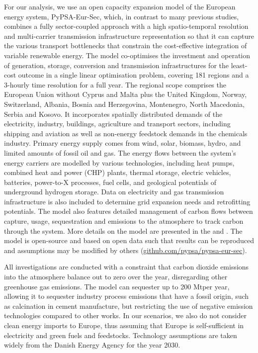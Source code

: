 For our analysis, we use an open capacity expansion model of the European energy
system, PyPSA-Eur-Sec, which, in contrast to many previous studies,
\cite{henningComprehensiveModel2014,mathiesenSmartEnergy2015,connollySmartEnergy2016,lofflerDesigningModel2017,blancoPotentialHydrogen2018,brownSynergiesSector2018,in-depth_2018,victoria2020}
combines a fully sector-coupled approach with a high spatio-temporal resolution
and multi-carrier transmission infrastructure representation so that it can
capture the various transport bottlenecks that constrain the cost-effective
integration of variable renewable energy. The model co-optimises the investment
and operation of generation, storage, conversion and transmission
infrastructures for the least-cost outcome in a single linear optimisation
problem, covering 181 regions and a 3-hourly time resolution for a full year.
The regional scope comprises the European Union without Cyprus and Malta plus the United
Kingdom, Norway, Switzerland, Albania, Bosnia and Herzegovina,
Montenegro, North Macedonia, Serbia and Kosovo. It incorporates spatially distributed
demands of the electricity, industry, buildings, agriculture and transport
sectors, including shipping and aviation as well as non-energy feedstock demands
in the chemicals industry. Primary energy supply comes from wind, solar,
biomass, hydro, and limited amounts of fossil oil and gas. The energy flows
between the system's energy carriers are modelled by various technologies,
including heat pumps, combined heat and power (CHP) plants, thermal storage,
electric vehicles, batteries, power-to-X processes, fuel cells, and geological
potentials of underground hydrogen storage. Data on electricity and gas
transmission infrastructure is also included to determine grid expansion needs
and retrofitting potentials. The model also features detailed management of
carbon flows between capture, usage, sequestration and emissions to the
atmosphere to track carbon through the system. More details on the model are
presented in the  and . The model is
open-source and based on open data such that results can be reproduced and
assumptions may be modified by others
(\href{https://github.com/pypsa/pypsa-eur-sec}{github.com/pypsa/pypsa-eur-sec}).

All investigations are conducted with a constraint that carbon dioxide emissions
into the atmosphere balance out to zero over the year, disregarding other
greenhouse gas emissions. The model can sequester up to 200 Mt\co per year,
allowing it to sequester industry process emissions that have a fossil origin,
such as calcination in cement manufacture, but restricting the use of negative
emission technologies compared to other works.
\cite{blancoPotentialHydrogen2018} In our scenarios, we also do not consider
clean energy imports to Europe, thus assuming that Europe is self-sufficient in
electricity and green fuels and feedstocks. Technology assumptions are taken
widely from the Danish Energy Agency for the year 2030. \cite{DEA}

